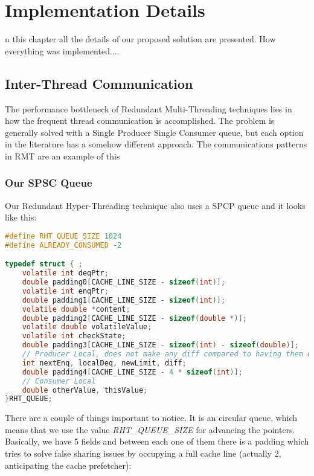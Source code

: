 %
%
\let\textcircled=\pgftextcircled
\chapter{Implementation Details}
\label{chap:implementationDetails}
n this chapter all the details of our proposed solution are presented. How everything was implemented....

\section{Inter-Thread Communication}
\label{sec:interThreadCommunication}
The performance bottleneck of Redundant Multi-Threading techniques lies in how the frequent thread communication is accomplished. The problem is generally solved with a Single Producer Single Consumer queue, but each option in the literature has a somehow different approach. The communications patterns in RMT are an example of this

\subsection{Our SPSC Queue}
\label{subsec:SPSCQueue}
Our Redundant Hyper-Threading technique also uses a SPCP queue and it looks like this:

\begin{lstlisting}[language = c]
#define RHT_QUEUE_SIZE 1024
#define ALREADY_CONSUMED -2

typedef struct { ;
    volatile int deqPtr;
    double padding0[CACHE_LINE_SIZE - sizeof(int)];
    volatile int enqPtr;
    double padding1[CACHE_LINE_SIZE - sizeof(int)];
    volatile double *content;
    double padding2[CACHE_LINE_SIZE - sizeof(double *)];
    volatile double volatileValue;
    volatile int checkState;
    double padding3[CACHE_LINE_SIZE - sizeof(int) - sizeof(double)];
    // Producer Local, does not make any diff compared to having them outside of the queue
    int nextEnq, localDeq, newLimit, diff;
    double padding4[CACHE_LINE_SIZE - 4 * sizeof(int)];
    // Consumer Local
    double otherValue, thisValue;
}RHT_QUEUE;
\end{lstlisting}

There are a couple of things important to notice. It is an circular queue, which means that we use the value \textit{RHT\_QUEUE\_SIZE} for advancing the pointers. Basically, we have 5 fields and between each one of them there is a padding which tries to solve false sharing issues by occupying a full cache line (actually 2, anticipating the cache prefetcher): 

